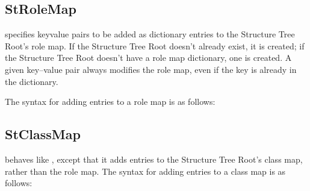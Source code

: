 \documentclass[letterpaper,12pt,english,openany,oneside]{sphinxmanual}
\begin{document}
\subsection{StRoleMap}
\label{\detokenize{pdfmark_Logical:strolemap}}
 specifies key\sphinxhyphen{}value pairs to be added as dictionary entries to the Structure Tree Root’s role map. If the Structure Tree Root doesn’t already exist, it is created; if the Structure Tree Root doesn’t have a role map dictionary, one is created. A given key–value pair always modifies the role map, even if the key is already in the dictionary.

The syntax for adding entries to a role map is as follows:

\begin{sphinxVerbatim}[commandchars=\\\{\}]
 \PYG{p}{[} 
\PYG{p}{[} 
\PYG{p}{[} 
        \PYG{p}{[}            
\PYG{p}{[} 
\PYG{p}{[} 
         
\end{sphinxVerbatim}


\subsection{StClassMap}
\label{\detokenize{pdfmark_Logical:stclassmap}}
 behaves like  , except that it adds entries to the Structure Tree Root’s class map, rather than the role map. The syntax for adding entries to a class map is as follows:

\begin{sphinxVerbatim}[commandchars=\\\{\}]
 \PYG{p}{[} 
\PYG{p}{[} 
        \PYG{p}{[}            
\PYG{p}{[} 
         
\end{sphinxVerbatim}
\end{document}
